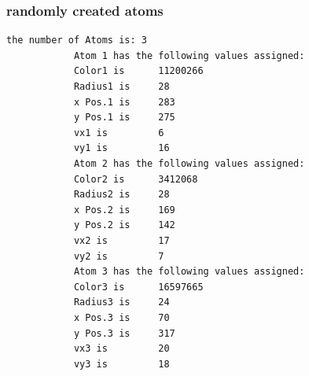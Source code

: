 \documentclass[11pt,titlepage]{article}
\begin{document}
			\subsubsection{randomly created atoms}
			\begin{lstlisting}[numbers=none]
			the number of Atoms is: 3
			Atom 1 has the following values assigned:
			Color1 is      11200266
			Radius1 is     28
			x Pos.1 is     283
			y Pos.1 is     275
			vx1 is         6
			vy1 is         16
			Atom 2 has the following values assigned:
			Color2 is      3412068
			Radius2 is     28
			x Pos.2 is     169
			y Pos.2 is     142
			vx2 is         17
			vy2 is         7
			Atom 3 has the following values assigned:
			Color3 is      16597665
			Radius3 is     24
			x Pos.3 is     70
			y Pos.3 is     317
			vx3 is         20
			vy3 is         18
			\end{lstlisting}
\end{document}
